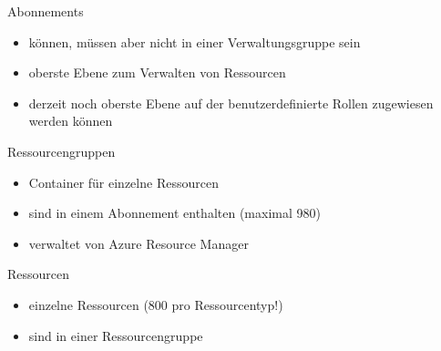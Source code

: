 \begin{flashcard}[Definition]{Abonnements}
  \begin{itemize}
    \item können, müssen aber nicht in einer Verwaltungsgruppe sein
    \item oberste Ebene zum Verwalten von Ressourcen
    \item derzeit noch oberste Ebene auf der benutzerdefinierte Rollen zugewiesen werden können
  \end{itemize}
\end{flashcard}

\begin{flashcard}[Definition]{Ressourcengruppen}
  \begin{itemize}
    \item Container für einzelne Ressourcen
    \item sind in einem Abonnement enthalten\newline
      (maximal 980)
    \item verwaltet von Azure Resource Manager
  \end{itemize}
\end{flashcard}

\begin{flashcard}[Definition]{Ressourcen}
  \begin{itemize}
    \item einzelne Ressourcen\newline
      (800 pro Ressourcentyp!)
    \item sind in einer Ressourcengruppe
  \end{itemize}
\end{flashcard}


